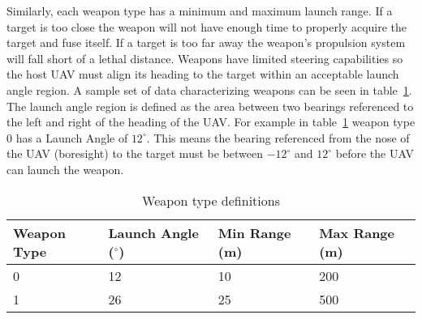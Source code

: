 Similarly, each weapon type has a minimum and maximum launch range.  If a target is too close the weapon will not have enough time to properly acquire the target and fuse itself.  If a target is too far away the weapon's propulsion system will fall short of a lethal distance.  Weapons have limited steering capabilities so the host UAV must align its heading to the target within an acceptable launch angle region. A sample set of data characterizing weapons can be seen in table~\ref{tab:weaponType}.  The launch angle region is defined as the area between two bearings referenced to the left and right of the heading of the UAV.  For example in table~\ref{tab:weaponType} weapon type 0 has a Launch Angle of $12^{\circ}$.  This means the bearing referenced from the nose of the UAV (boresight) to the target must be between $-12^{\circ}$ and $12^{\circ}$ before the UAV can launch the weapon.


\begin{table}[H]
	\caption{Weapon type definitions}
	\centering
	\label{tab:weaponType}
	\begin{tabular}{|p{1.4cm}|p{1.6cm}|p{1.2cm}|p{1.2cm}|}
		\hline
		Weapon Type & Launch Angle ($^{\circ}$) & Min Range (m) & Max Range (m)\\ \hline
		0 & 12 & 10 & 200 \\
		1 & 26 & 25 & 500 \\
		\hline
	\end{tabular}
\end{table}

